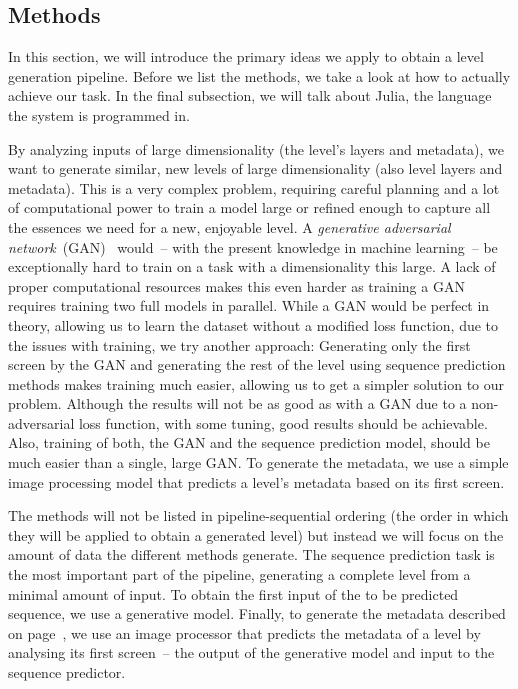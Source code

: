 \subsection{Methods}
\label{sec:methods}

In this section, we will introduce the primary ideas we apply to
obtain a level generation pipeline. Before we list the methods, we
take a look at how to actually achieve our task. In the final
subsection, we will talk about Julia, the language the system is
programmed in.

By analyzing inputs of large dimensionality (the level's layers and
metadata), we want to generate similar, new levels of large
dimensionality (also level layers and metadata). This is a very
complex problem, requiring careful planning and a lot of computational
power to train a model large or refined enough to capture all the
essences we need for a new, enjoyable level. A \emph{generative adversarial
network}~(GAN)~\cite{goodfellowGenerativeAdversarialNetworks2014}
would~-- with the present knowledge in machine learning~-- be
exceptionally hard to train on a task with a dimensionality this
large. A lack of proper computational resources makes this even harder
as training a GAN requires training two full models in parallel. While
a GAN would be perfect in theory, allowing us to learn the dataset
without a modified loss function, due to the issues with training, we
try another approach: Generating only the first screen by the GAN and
generating the rest of the level using sequence prediction methods
makes training much easier, allowing us to get a simpler solution to
our problem. Although the results will not be as good as with a GAN
due to a non-adversarial loss function, with some tuning, good results
should be achievable. Also, training of both, the GAN and the sequence
prediction model, should be much easier than a single, large GAN. To
generate the metadata, we use a simple image processing model that
predicts a level's metadata based on its first screen.

The methods will not be listed in pipeline-sequential ordering (the
order in which they will be applied to obtain a generated level) but
instead we will focus on the amount of data the different methods
generate. The sequence prediction task is the most important part of
the pipeline, generating a complete level from a minimal amount of
input. To obtain the first input of the to be predicted sequence, we
use a generative model. Finally, to generate the metadata described on
page~\pageref{par:metadata}, we use an image processor that predicts
the metadata of a level by analysing its first screen~-- the output of
the generative model and input to the sequence predictor.

